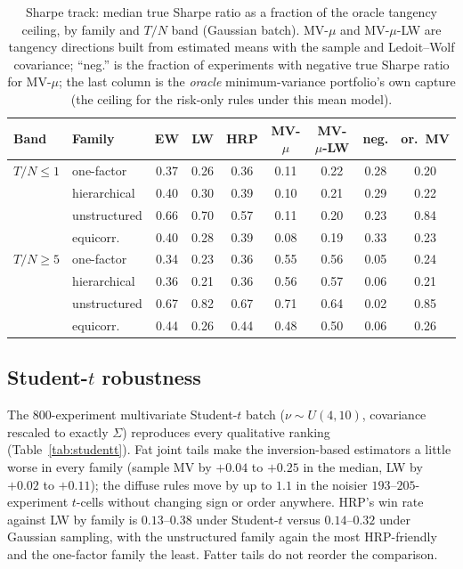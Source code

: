 \documentclass[11pt]{article}
\newcommand{\Sig}{\Sigma}
\newcommand{\TN}{T/N}
\begin{document}
\begin{table}[t]
\centering
\caption{Sharpe track: median true Sharpe ratio as a fraction of the oracle
tangency ceiling, by family and $\TN$ band (Gaussian batch). MV-$\mu$ and
MV-$\mu$-LW are tangency directions built from estimated means with the
sample and Ledoit--Wolf covariance; ``neg.'' is the fraction of experiments
with negative true Sharpe ratio for MV-$\mu$; the last column is the
\emph{oracle} minimum-variance portfolio's own capture (the ceiling for the
risk-only rules under this mean model).}
\label{tab:sharpe}
\small
\begin{tabular}{ll ccc cc c c}
\toprule
Band & Family & EW & LW & HRP & MV-$\mu$ & MV-$\mu$-LW & neg. & or.\ MV \\
\midrule
$\TN\le1$ & one-factor    & 0.37 & 0.26 & 0.36 & 0.11 & 0.22 & 0.28 & 0.20 \\
          & hierarchical  & 0.40 & 0.30 & 0.39 & 0.10 & 0.21 & 0.29 & 0.22 \\
          & unstructured  & 0.66 & 0.70 & 0.57 & 0.11 & 0.20 & 0.23 & 0.84 \\
          & equicorr.     & 0.40 & 0.28 & 0.39 & 0.08 & 0.19 & 0.33 & 0.23 \\
\midrule
$\TN\ge5$ & one-factor    & 0.34 & 0.23 & 0.36 & 0.55 & 0.56 & 0.05 & 0.24 \\
          & hierarchical  & 0.36 & 0.21 & 0.36 & 0.56 & 0.57 & 0.06 & 0.21 \\
          & unstructured  & 0.67 & 0.82 & 0.67 & 0.71 & 0.64 & 0.02 & 0.85 \\
          & equicorr.     & 0.44 & 0.26 & 0.44 & 0.48 & 0.50 & 0.06 & 0.26 \\
\bottomrule
\end{tabular}
\end{table}

\subsection{Student-$t$ robustness}
\label{sec:studentt}

The $800$-experiment multivariate Student-$t$ batch ($\nu\sim U(4,10)$,
covariance rescaled to exactly $\Sig$) reproduces every qualitative ranking
(Table~\ref{tab:studentt}). Fat joint tails make the inversion-based
estimators a little worse in every family (sample MV by $+0.04$ to $+0.25$
in the median, LW by $+0.02$ to $+0.11$); the diffuse rules move by up to
$1.1$ in the noisier $193$--$205$-experiment $t$-cells without changing
sign or order anywhere. HRP's win rate against LW by family is
$0.13$--$0.38$ under Student-$t$ versus $0.14$--$0.32$ under Gaussian
sampling, with the unstructured family again the most HRP-friendly and the
one-factor family the least. Fatter tails do not reorder the comparison.
\end{document}

